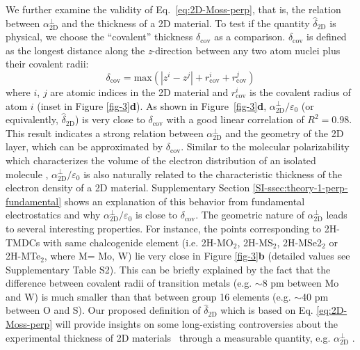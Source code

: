 \documentclass[journal=ancac3,manuscript=article,email=true,hyperref=true,keywords=false]{achemso}
\begin{document}
We further examine the validity of Eq.~\ref{eq:2D-Moss-perp}, that is,
the relation between $\alpha_{\mathrm{2D}}^{\perp}$ and the thickness 
of a 2D material. To test if the quantity $\hat{\delta}_{\mathrm{2D}}$
is physical, we choose the ``covalent'' thickness 
$\delta_{\mathrm{cov}}$ as a comparison.  
$\delta_{\mathrm{cov}}$ is defined as the longest distance
along the \textit{z}-direction between any two atom nuclei plus their covalent
radii:
%
%
\begin{equation}
  \label{eq:cov-thick}
  \delta_{\mathrm{cov}} = \mathrm{max}(|z^{i} - z^{j}|
  + r^{i}_{\mathrm{cov}} + r^{j}_{\mathrm{cov}})
\end{equation}
%
where $i$, $j$ are atomic indices in the 2D material and
$r_{\mathrm{cov}}^{i}$ is the covalent radius of atom $i$ (inset in Figure
\ref{fig-3}{\textbf d}). As shown in Figure~\ref{fig-3}{\textbf
  d}, $\alpha_{\mathrm{2D}}^{\perp}/\varepsilon_{0}$ (or equivalently,
$\hat{\delta}_{\mathrm{2D}}$) is very close to $\delta_{\mathrm{cov}}$
with a good linear correlation of $R^{2}=0.98$. This result indicates
a strong relation between $\alpha_{\mathrm{2D}}^{\perp}$ and the
geometry of the 2D layer, which can be approximated by
$\delta_{\mathrm{cov}}$. Similar to the molecular polarizability which
characterizes the volume of the electron distribution of an isolated molecule
\cite{Israelachvili_2011},
$\alpha_{\mathrm{2D}}^{\perp}/\varepsilon_{0}$ is also naturally
related to the characteristic thickness of the electron density of a 2D
material. Supplementary Section
\ref{SI-ssec:theory-1-perp-fundamental} shows an explanation of this
behavior from fundamental electrostatics and why
$\alpha_{\mathrm{2D}}^{\perp} / \varepsilon_{0}$ is close to
$\delta_{\mathrm{cov}}$. 
%
%
The geometric nature of $\alpha_{\mathrm{2D}}^{\perp}$ leads to
several interesting properties. For instance, the points corresponding
to 2H-TMDCs with same chalcogenide element (i.e. 2H-MO$_{2}$,
2H-MS$_{2}$, 2H-MSe2$_{2}$ or 2H-MTe$_{2}$, where M= Mo, W) 
lie very close in Figure
\ref{fig-3}\textbf{b} (detailed values see Supplementary Table
S2). This can be briefly explained by the fact that the difference
between covalent radii of transition metals (e.g. $\sim$8 pm between
Mo and W) is much smaller than that between group 16 elements
(e.g. $\sim$40 pm between O and S).
%
%
Our proposed definition of
$\hat{\delta}_{\mathrm{2D}}$ which is based on
Eq. \ref{eq:2D-Moss-perp} will provide insights 
on some long-existing controversies about the experimental thickness
of 2D materials~\cite{Shearer_2016} through a 
measurable quantity, e.g. $\alpha_{\mathrm{2D}}^{\perp}$
\cite{Antoine_1999,Cherniavskaya_2003,Krauss_1999_EFM}.
% 
%
\end{document}
